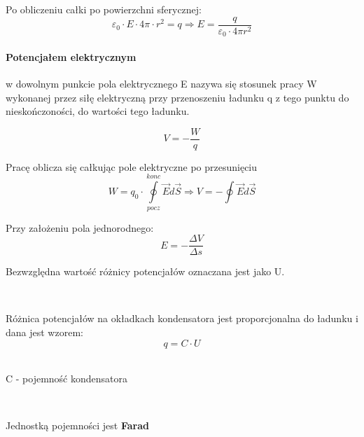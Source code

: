 \documentclass{article}
\begin{document}
            Po obliczeniu całki po powierzchni sferycznej:
            \begin{equation}
                \varepsilon_0 \cdotp E \cdotp 4\pi \cdotp r^2 = q
                \Longrightarrow
                E = \frac{q}{\varepsilon_0 \cdotp 4 \pi r^2}
            \end{equation}

            \paragraph{Potencjałem elektrycznym}
            w dowolnym punkcie pola elektrycznego E nazywa się
            stosunek pracy W wykonanej przez siłę elektryczną przy
            przenoszeniu ładunku q z tego punktu do nieskończoności,
            do wartości tego ładunku.

            \begin{equation}
                V = -\frac{W}{q}
            \end{equation}

            Pracę oblicza się całkując pole elektryczne po przesunięciu
            \begin{equation}
                W = q_0 \cdotp \oint\limits_{pocz}^{konc} {\vec{E}
                d\vec{S}}
                \Longrightarrow
                V = -\oint\nolimits_{} \vec E d\vec S
            \end{equation}

            Przy założeniu pola jednorodnego:
            \begin{equation}
                E = - \frac{\Delta V}{\Delta s}
            \end{equation}
            
            Bezwzględna wartość różnicy potencjałów oznaczana jest
            jako U.

            \
            
            Różnica potencjałów na okładkach kondensatora jest 
            proporcjonalna do ładunku i dana jest wzorem:
            \begin{equation}
                q = C \cdotp U
            \end{equation}
            \
            
            C - pojemność kondensatora
            
            \
            
            Jednostką pojemności jest \textbf{Farad}
\end{document}
